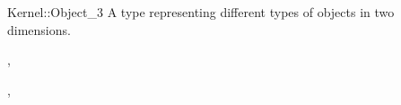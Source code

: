 \begin{ccRefConcept}{Kernel::Object_3}
A type representing different types of objects in two dimensions.

\ccRefines
{},

\ccSeeAlso
{}, 

\end{ccRefConcept}
